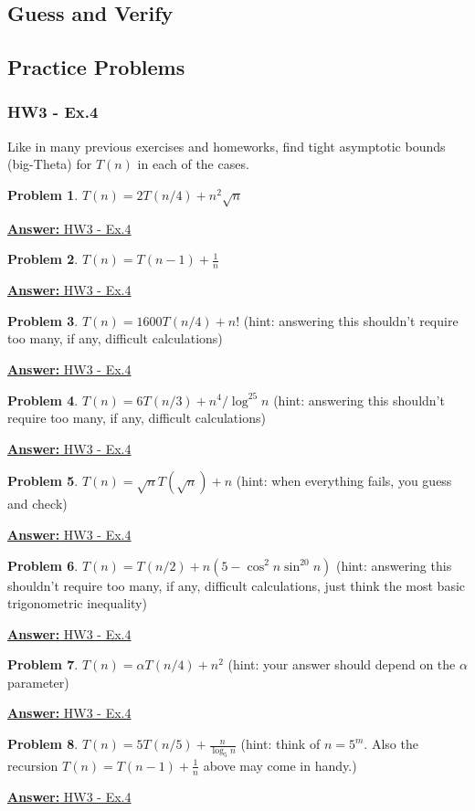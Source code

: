 \documentclass[12pt]{article}
\theoremstyle{definition}
\newtheorem{practiceproblem}{Problem}[section]
\def\scratchwork{\vspace*{15em}} %
\def\ghbase{https://github.com/zacktraczyk/CSE102-Midterm-Study-Guide/blob/main/hw\%20answers/}
\newenvironment{problem}[2]
{
	\def\linktext{#1}
	\def\linkdest{\ghbase#2}
	\noindent \begin{minipage}{\textwidth}
		\begin{practiceproblem}
}
{	
		\end{practiceproblem}
		\scratchwork

		\href{\linkdest}{\textbf{Answer:} \linktext}
	\end{minipage}
}
\def\psetthree{vaggos\_W\_24\_CSE102\_01\_PSET\_3\_solutions.pdf}
\begin{document}
	\subsection{Guess and Verify}

	\subsection{Practice Problems}

	\subsubsection{HW3 - Ex.4}

	Like in many previous exercises and homeworks, find tight asymptotic bounds
	(big-Theta) for $T(n)$ in each of the cases.

	\begin{problem}{HW3 - Ex.4}{\psetthree}
		$T(n)=2T(n/4)+n^2\sqrt n$
	\end{problem}
	\begin{problem}{HW3 - Ex.4}{\psetthree}
		$T(n)=T(n-1)+\frac1n$
	\end{problem}
	\begin{problem}{HW3 - Ex.4}{\psetthree}
		$T(n)=1600T(n/4)+n!$ (hint: answering this shouldn't require too many,
		if any, difficult calculations)
	\end{problem}
	\begin{problem}{HW3 - Ex.4}{\psetthree}
		$T(n)=6T(n/3)+n^4/\log^{25} n$ (hint: answering this shouldn't require
		too many, if any, difficult calculations)
	\end{problem}
	\begin{problem}{HW3 - Ex.4}{\psetthree}
		$T(n)=\sqrt n T(\sqrt{n}) + n$ (hint: when everything fails, you guess
		and check)
	\end{problem}
	\begin{problem}{HW3 - Ex.4}{\psetthree}
		$T(n)=T(n/2)+n(5-\cos^2n\sin^{20}n)$ (hint: answering this shouldn't
		require too many, if any, difficult calculations, just think the most
		basic trigonometric inequality)
	\end{problem}
	\begin{problem}{HW3 - Ex.4}{\psetthree}
		$T(n)=\alpha T(n/4)+n^2$ (hint: your answer should depend on the
		$\alpha$ parameter)
	\end{problem}
	\begin{problem}{HW3 - Ex.4}{\psetthree}
		$T(n)=5T(n/5) +\frac{n}{\log_5 n}$ (hint: think of $n=5^m$. Also the
		recursion $T(n)=T(n-1)+\frac1n$ above may come in handy.)
	\end{problem}
\end{document}
